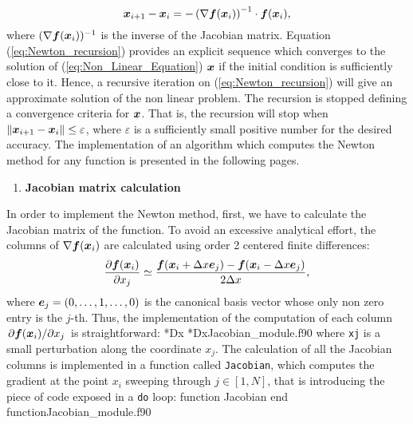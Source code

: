       \begin{equation}
      	\boldsymbol{x}_{i+1}-\boldsymbol{x}_{i} 
      	= - \left(
      	\nabla\boldsymbol{f}(\boldsymbol{x}_{i})
      	\right)^{-1}  \cdot \boldsymbol{f}(\boldsymbol{x}_i),
      	\label{eq:Newton_recursion}
      \end{equation}
      where $(\nabla \boldsymbol{f}(\boldsymbol{x}_{i}))^{-1} $ is the inverse of the Jacobian matrix. Equation (\ref{eq:Newton_recursion}) provides an explicit sequence which converges to the solution of (\ref{eq:Non_Linear_Equation}) $\boldsymbol{x}$ if the initial condition is sufficiently close to it. Hence, a recursive iteration on (\ref{eq:Newton_recursion}) will give an approximate solution of the non linear problem. The recursion is stopped defining a convergence criteria for $\boldsymbol{x}$. That is, the recursion will stop when $\norm{\boldsymbol{x}_{i+1}-\boldsymbol{x}_{i}}\leq\varepsilon$, where $\varepsilon$ is a sufficiently small positive number for the desired accuracy. The implementation of an algorithm which computes the Newton method for any function is presented in the following pages.
      
      
      \begin{enumerate}
      	\item \textbf{Jacobian matrix calculation}
      \end{enumerate}
      In order to implement the Newton method, first, we have to calculate the Jacobian matrix of the function. To avoid an excessive analytical effort, the columns of $\nabla\boldsymbol{f}(\boldsymbol{x}_i)$ are calculated using order 2 centered finite differences:
      \begin{align}
      	\pdv{\boldsymbol{f}(\boldsymbol{x}_{i})}{x_j}(\boldsymbol{x}_{i})
      	\simeq 
      	\frac{\boldsymbol{f}(\boldsymbol{x}_{i} + \Delta x\boldsymbol{e}_j) - \boldsymbol{f}(\boldsymbol{x}_{i} - \Delta x\boldsymbol{e}_j)}{2\Delta x},
      \end{align}
      where $\boldsymbol{e}_j=(0,\ldots,1,\ldots,0)$ is the canonical basis vector whose only non zero entry is the $j$-th. Thus, the implementation of the computation of each column $\pdv*{\boldsymbol{f}(\boldsymbol{x}_{i})}{x_j}(\boldsymbol{x}_{i})$ is straightforward:
      \vspace{0.5cm} 
      {*Dx}
      {*Dx}{Jacobian_module.f90}
       where \verb|xj| is a small perturbation along the coordinate $x_j$.
       The calculation of all the Jacobian columns is implemented in a function called \verb|Jacobian|, which computes the gradient at the point $x_i$ sweeping through $j\in[1,N]$, that is introducing the piece of code exposed in a \verb|do| loop:
      \vspace{0.5cm} 
      {function Jacobian}
      {end function}{Jacobian_module.f90}
      
